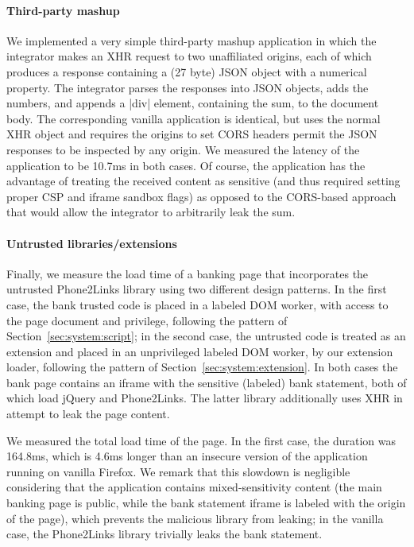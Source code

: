 \paragraph{Third-party mashup}

We implemented a very simple third-party mashup application in which
the integrator makes an XHR request to two unaffiliated origins, each
of which produces a response containing a (27 byte) JSON object with a
numerical property.
%
The integrator parses the responses into JSON objects, adds the
numbers, and appends a \js|div| element, containing the sum, to the
document body.
%
The corresponding vanilla application is identical, but uses the
normal XHR object and requires the origins to set CORS headers permit
the JSON responses to be inspected by any origin.
%
We measured the latency of the application to be 10.7ms in both cases.
%
Of course, the \sys{} application has the advantage of treating the
received content as sensitive (and thus required setting proper CSP
and iframe sandbox flags) as opposed to the CORS-based approach that
would allow the integrator to arbitrarily leak the sum.

\paragraph{Untrusted libraries/extensions}

Finally, we measure the load time of a banking page that incorporates
the untrusted Phone2Links library using two different design patterns.
%
In the first case, the bank trusted code is placed in a labeled DOM
worker, with access to the page document and privilege, following the
pattern of Section~\ref{sec:system:script}; in the second case, the
untrusted code is treated as an extension and placed in an
unprivileged labeled DOM worker, by our extension loader, following
the pattern of Section~\ref{sec:system:extension}.
%
In both cases the bank page contains an iframe with the sensitive
(labeled) bank statement, both of which load jQuery and
Phone2Links.
%
The latter library additionally uses XHR in attempt to leak the page
content.

We measured the total load time of the page. In the first case, the
duration was 164.8ms, which is 4.6ms longer than an insecure version
of the application running on vanilla Firefox.
%
We remark that this slowdown is negligible considering that
the application contains mixed-sensitivity content (the main banking
page is public, while the bank statement iframe is labeled with the
origin of the page), which \sys{} prevents the malicious library from
leaking; in the vanilla case, the Phone2Links library trivially leaks
the bank statement.

